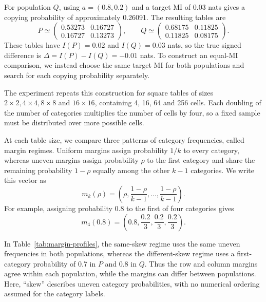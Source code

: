 For population \(Q\), using \(a=(0.8,0.2)\) and a target MI of 0.03 nats
gives a copying probability of approximately 0.26091. The resulting
tables are
\begin{equation}
 P\simeq\begin{pmatrix}0.53273&0.16727\\0.16727&0.13273\end{pmatrix},
 \qquad
 Q\simeq\begin{pmatrix}0.68175&0.11825\\0.11825&0.08175\end{pmatrix}.
 \label{eq:design-example-pair}
\end{equation}
These tables have \(I(P)=0.02\) and \(I(Q)=0.03\) nats, so the true
signed difference is \(\Delta=I(P)-I(Q)=-0.01\) nats. To construct an
equal-MI comparison, we instead choose the
same target MI for both populations and search for each copying
probability separately.

\medskip
{}

The experiment repeats this construction for square tables of sizes
\(2\times2,4\times4,8\times8\) and \(16\times16\), containing
4, 16, 64 and 256 cells. Each doubling of the number of categories multiplies the number of
cells by four, so a fixed sample must be distributed over more possible
cells.

At each table size, we compare three patterns of category frequencies,
called margin regimes. Uniform margins assign probability \(1/k\) to
every category, whereas uneven margins assign probability \(\rho\) to
the first category and share the remaining probability \(1-\rho\) equally
among the other \(k-1\) categories. We write this vector as
\begin{equation}
 m_k(\rho)=\left(\rho,\frac{1-\rho}{k-1},\ldots,
                   \frac{1-\rho}{k-1}\right).
 \label{eq:skew-margin}
\end{equation}
For example, assigning probability 0.8 to the first of four categories gives
\begin{equation*}
 m_4(0.8)=\left(0.8,\frac{0.2}{3},\frac{0.2}{3},\frac{0.2}{3}\right).
\end{equation*}

In Table~\ref{tab:margin-profiles}, the same-skew regime uses the same
uneven frequencies in both populations, whereas the different-skew regime
uses a first-category probability of 0.7 in \(P\) and 0.8 in \(Q\).
Thus the row and column margins agree within each population, while the
margins can differ between populations.
Here, ``skew'' describes uneven category probabilities, with no numerical
ordering assumed for the category labels.

